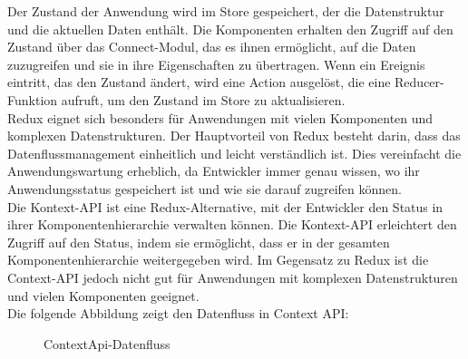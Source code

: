 Der Zustand der Anwendung wird im Store gespeichert, der die Datenstruktur und die aktuellen Daten enthält. Die Komponenten erhalten den Zugriff auf den Zustand über das Connect-Modul, das es ihnen ermöglicht, auf die Daten zuzugreifen und sie in ihre Eigenschaften zu übertragen. Wenn ein Ereignis eintritt, das den Zustand ändert, wird eine Action ausgelöst, die eine Reducer-Funktion aufruft, um den Zustand im Store zu aktualisieren.\\
Redux eignet sich besonders für Anwendungen mit vielen Komponenten und komplexen Datenstrukturen. Der Hauptvorteil von Redux besteht darin, dass das Datenflussmanagement einheitlich und leicht verständlich ist. Dies vereinfacht die Anwendungswartung erheblich, da Entwickler immer genau wissen, wo ihr Anwendungsstatus gespeichert ist und wie sie darauf zugreifen können.\\
Die Kontext-API ist eine Redux-Alternative, mit der Entwickler  den Status in ihrer Komponentenhierarchie verwalten können. Die Kontext-API erleichtert den Zugriff auf den Status, indem sie ermöglicht, dass er in der gesamten Komponentenhierarchie weitergegeben wird. Im Gegensatz zu Redux ist die Context-API jedoch nicht gut für Anwendungen mit komplexen Datenstrukturen und  vielen Komponenten geeignet.\\\cite{scalablepath}
Die folgende Abbildung zeigt den Datenfluss in Context API:\\
\begin{figure}[htbp]
	\centering
	\caption{ContextApi-Datenfluss}
\end{figure}\\
